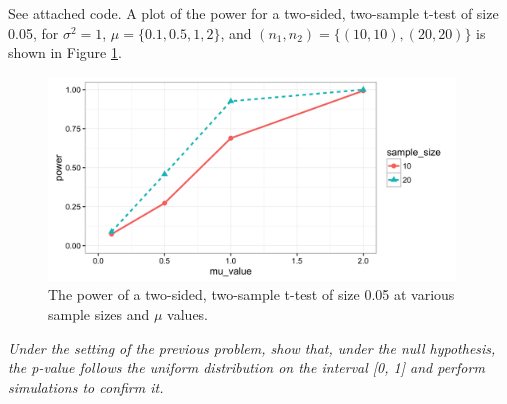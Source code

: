 \documentclass[11pt]{exam} %
\begin{document}
\begin{questions}
See attached code. A plot of the power for a two-sided, two-sample t-test of size 0.05, for $\sigma^2 =1$, $\mu = \{0.1, 0.5, 1, 2 \}$, and $(n_1, n_2) = \{(10,10), (20,20)\}$ is shown in Figure \ref{fig:6}.

\begin{figure}[!h]
	\centering
	\includegraphics[width=4.25in]{6.png}
	\caption{The power of a two-sided, two-sample t-test of size 0.05 at various sample sizes and $\mu$ values.}
	\label{fig:6}
\end{figure}



\titledquestion{} %
\textit{Under the setting of the previous problem, show that, under the null hypothesis, the p-value follows the uniform distribution on the interval [0, 1] and perform simulations to confirm it.}




\end{questions}

\listoftodos
\end{document}
